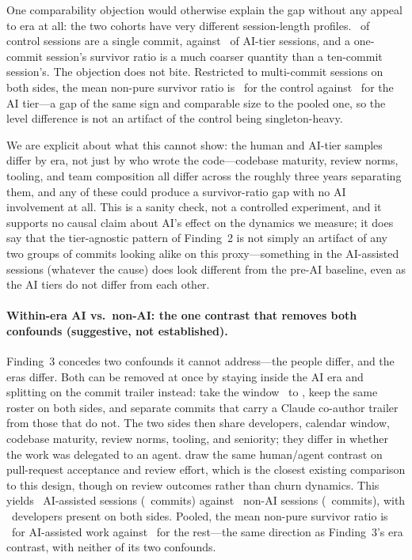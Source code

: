 One comparability objection would otherwise explain the gap without any appeal to era at all: the two cohorts have very different session-length profiles. \statPCCtrlSingleCommitPct\ of control sessions are a single commit, against \statPCSingleCommitPct\ of AI-tier sessions, and a one-commit session's survivor ratio is a much coarser quantity than a ten-commit session's. The objection does not bite. Restricted to multi-commit sessions on both sides, the mean non-pure survivor ratio is \statPCCtrlTauMulti\ for the control against \statPCTauMulti\ for the AI tier---a gap of the same sign and comparable size to the pooled one, so the level difference is not an artifact of the control being singleton-heavy.

We are explicit about what this cannot show: the human and AI-tier samples differ by era, not just by who wrote the code---codebase maturity, review norms, tooling, and team composition all differ across the roughly three years separating them, and any of these could produce a survivor-ratio gap with no AI involvement at all. This is a sanity check, not a controlled experiment, and it supports no causal claim about AI's effect on the dynamics we measure; it does say that the tier-agnostic pattern of Finding~2 is not simply an artifact of any two groups of commits looking alike on this proxy---something in the AI-assisted sessions (whatever the cause) does look different from the pre-AI baseline, even as the AI tiers do not differ from each other.

\paragraph{Within-era AI vs.\ non-AI: the one contrast that removes both confounds (suggestive, not established).} Finding~3 concedes two confounds it cannot address---the people differ, and the eras differ. Both can be removed at once by staying inside the AI era and splitting on the commit trailer instead: take the window \statPCWithinSince\ to \statPCWithinUntil, keep the same roster on both sides, and separate commits that carry a Claude co-author trailer from those that do not. The two sides then share developers, calendar window, codebase maturity, review norms, tooling, and seniority; they differ in whether the work was delegated to an agent. \citet{pansuriya2026predicting} draw the same human/agent contrast on pull-request acceptance and review effort, which is the closest existing comparison to this design, though on review outcomes rather than churn dynamics. This yields \statPCWithinAISessions\ AI-assisted sessions (\statPCWithinAICommits\ commits) against \statPCWithinNonAISessions\ non-AI sessions (\statPCWithinNonAICommits\ commits), with \statPCWithinDevelopers\ developers present on both sides. Pooled, the mean non-pure survivor ratio is \statPCWithinTauAI\ for AI-assisted work against \statPCWithinTauNonAI\ for the rest---the same direction as Finding~3's era contrast, with neither of its two confounds.

